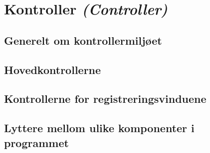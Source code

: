 \section{Kontroller \emph{(Controller)}} \label{sec:kontroller}

\subsection{Generelt om kontrollermiljøet}
\subsection{Hovedkontrollerne}
\subsection{Kontrollerne for registreringsvinduene}
\subsection{Lyttere mellom ulike komponenter i programmet} \label{sec:kontrollerlyttere}